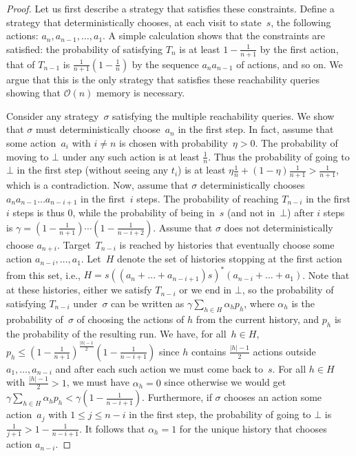 \documentclass{llncs}
\begin{document}
\begin{proof}
Let us first describe a strategy that satisfies these constraints.
Define a strategy that deterministically
chooses, at each visit to state~$s$, the following actions: $a_n,a_{n-1},\ldots,a_1$. A simple calculation
shows that the constraints are satisfied: the probability of satisfying $T_n$ is at least $1-\frac{1}{n+1}$ by the first action,
that of $T_{n-1}$ is $\frac{1}{n+1}(1-\frac{1}{n})$ by the sequence $a_na_{n-1}$ of actions, and so on.
We argue that this is the only strategy that satisfies these reachability queries showing that $\mathcal{O}(n)$ memory is necessary.

Consider any strategy~$\sigma$ satisfying the multiple reachability queries. We show that $\sigma$ must deterministically choose~$a_n$ in the first step.
In fact, assume that some action~$a_i$ with $i\neq n$ is chosen with probability~$\eta>0$. The probability of moving to $\bot$ under any such action is at least
$\frac{1}{n}$. Thus the probability of going to $\bot$ in the first step (without seeing any $t_i$) is at least
$\eta\frac{1}{n} + (1-\eta) \frac{1}{n+1} > \frac{1}{n+1}$, which is a contradiction.
Now, assume that $\sigma$ deterministically chooses $a_na_{n-1}\ldots a_{n-i+1}$ in the first~$i$ steps. The probability of reaching $T_{n-i}$ in the first $i$ steps is thus $0$,
while the probability of being in~$s$ (and not in~$\bot$) after $i$ steps is $\gamma = (1-\frac{1}{n+1})\cdots (1-\frac{1}{n-i+2})$.
Assume that $\sigma$ does not deterministically choose $a_{n+i}$.
Target~$T_{n-i}$ is reached by histories that eventually choose some action $a_{n-i},\ldots, a_1$. Let~$H$ denote the set of histories
stopping at the first action from this set, i.e.,
$H = s((a_n+\ldots+a_{n-i+1})s)^*(a_{n-i}+\ldots+a_1)$.
Note that at these histories, either we satisfy $T_{n-i}$ or we end in $\bot$, so the probability of satisfying $T_{n-i}$ under~$\sigma$ can be written as
$\gamma \sum_{h \in H} \alpha_h p_h$, where $\alpha_h$ is the probability of~$\sigma$ of choosing the actions of $h$ from the current history,
and $p_h$ is the probability of the resulting run.
We have, for all~$h \in H$, $p_h \leq (1-\frac{1}{n+1})^{\frac{|h|-1}{2}}(1-\frac{1}{n-i+1})$ since 
$h$ contains $\frac{|h|-1}{2}$ actions outside $a_1,\ldots,a_{n-i}$ and  after each such action 
we must come back to~$s$.
For all $h \in H$ with $\frac{|h|-1}{2}>1$, we must have $\alpha_h = 0$ since otherwise we would get $\gamma \sum_{h \in H} \alpha_h p_h< \gamma(1-\frac{1}{n-i+1})$.
Furthermore, if $\sigma$ chooses an action some action~$a_j$ with $1\leq j \leq n-i$ in the first step, the probability of going to $\bot$
is $\frac{1}{j+1} > 1-\frac{1}{n-i+1}$. It follows that $\alpha_h=1$ for the unique history that chooses action $a_{n-i}$.
\end{proof}
\end{document}
